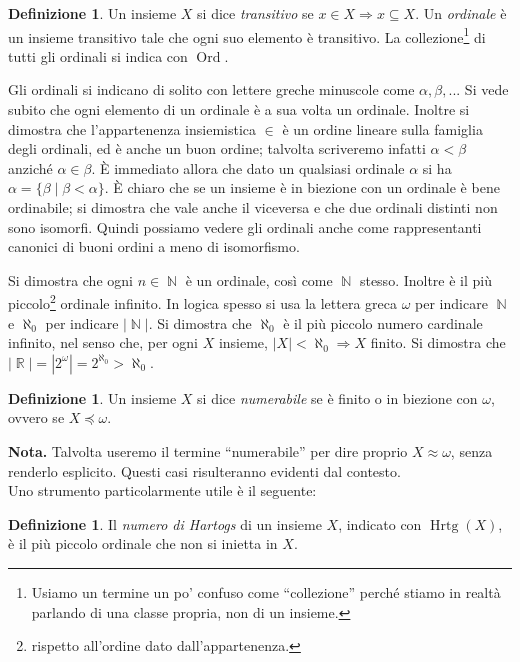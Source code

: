\documentclass[12pt,a4paper]{report}
\theoremstyle{definition}
\newtheorem{defn}[teo]{Definizione}  %
\theoremstyle{num.custom-title}
\DeclareMathOperator{\Hrtg}{\text{Hrtg}}
\DeclareMathOperator{\Ord}{\text{Ord}}
\DeclareMathOperator{\N}{\mathbb{N}}
\DeclareMathOperator{\R}{\mathbb{R}}
\DeclareMathOperator{\imp}{\Rightarrow}
\begin{document}
\begin{defn}
Un insieme $X$ si dice \emph{transitivo} se $x \in X \imp x \subseteq X$. Un \emph{ordinale} è un insieme transitivo tale che ogni suo elemento è transitivo. La collezione\footnote{Usiamo un termine un po' confuso come ``collezione'' perché stiamo in realtà parlando di una classe propria, non di un insieme.} di tutti gli ordinali si indica con $\Ord$.
\end{defn}

Gli ordinali si indicano di solito con lettere greche minuscole come $\alpha, \beta,...$ Si vede subito che ogni elemento di un ordinale è a sua volta un ordinale. Inoltre si dimostra che l'appartenenza insiemistica $\in$ è un ordine lineare sulla famiglia degli ordinali, ed è anche un buon ordine; talvolta scriveremo infatti $\alpha < \beta$ anziché $\alpha \in \beta$. È immediato allora che dato un qualsiasi ordinale $\alpha$ si ha $\alpha=\{\beta \mid \beta < \alpha\}$. È chiaro che se un insieme è in biezione con un ordinale è bene ordinabile; si dimostra che vale anche il viceversa e che due ordinali distinti non sono isomorfi. Quindi possiamo vedere gli ordinali anche come rappresentanti canonici di buoni ordini a meno di isomorfismo.

Si dimostra che ogni $n \in \N$ è un ordinale, così come $\N$ stesso. Inoltre è il più piccolo\footnote{rispetto all'ordine dato dall'appartenenza.} ordinale infinito. In logica spesso si usa la lettera greca $\omega$ per indicare $\N$ e $\aleph_0$ per indicare $|\N|$. Si dimostra che $\aleph_0$ è il più piccolo numero cardinale infinito, nel senso che, per ogni $X$ insieme, $|X|<\aleph_0 \imp X$ finito. Si dimostra che $|\R|=|2^\omega|=2^{\aleph_0} > \aleph_0$.

\begin{defn}
Un insieme $X$ si dice \emph{numerabile} se è finito o in biezione con $\omega$, ovvero se $X \preceq \omega$.
\end{defn}

\noindent\textbf{Nota.} Talvolta useremo il termine ``numerabile'' per dire proprio $X \approx \omega$, senza renderlo esplicito. Questi casi risulteranno evidenti dal contesto.\\

Uno strumento particolarmente utile è il seguente:

\begin{defn}
Il \emph{numero di Hartogs} di un insieme $X$, indicato con $\Hrtg(X)$, è il più piccolo ordinale che non si inietta in $X$. 
\end{defn}
\end{document}

